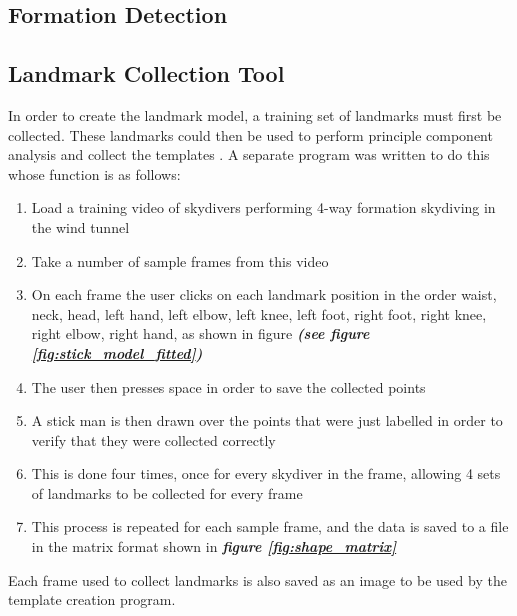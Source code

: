 \documentclass[a4paper, 12pt]{article}
\begin{document}
	\subsection{Formation Detection}
	
	\subsection{Landmark Collection Tool}
	In order to create the landmark model, a training set of landmarks must first be collected.
	These landmarks could then be used to perform principle component analysis  and collect the templates .
	A separate program was written to do this whose function is as follows:
	\begin{enumerate}
		\item Load a training video of skydivers performing 4-way formation skydiving in the wind tunnel
		\item Take a number of sample frames from this video
		\item On each frame the user clicks on each landmark position in the order waist, neck, head, left hand, left elbow, left knee, left foot,
		right foot, right knee, right elbow, right hand, as shown in figure \textbf{\emph{(see figure \ref{fig:stick_model_fitted})}}
		\item The user then presses space in order to save the collected points
		\item A stick man is then drawn over the points that were just labelled in order to verify that they were collected correctly
		\item This is done four times, once for every skydiver in the frame, allowing 4 sets of landmarks to be collected for every frame
		\item This process is repeated for each sample frame, and the data is saved to a file in the matrix format shown in \textbf{\emph{figure \ref{fig:shape_matrix}}}
	\end{enumerate}
	Each frame used to collect landmarks is also saved as an image to be used by the template creation program.
	
	
	
\end{document}
